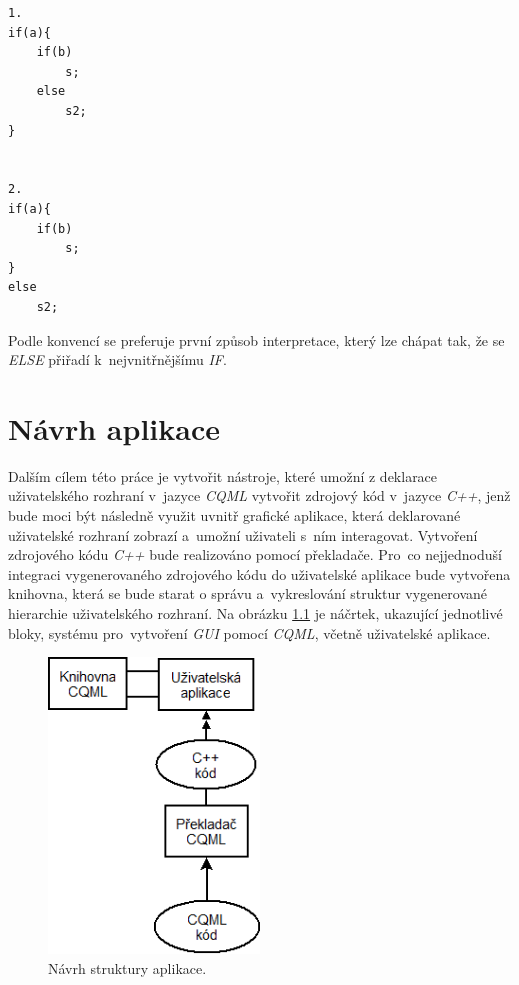 \documentclass[11pt,twoside,a4paper]{book}
\begin{document}
\begin{lstlisting}[float,frame=single,caption=Možnosti interpretace víceznačného výroku \textit{IF}-\textit{ELSE},label=lst:if3]
1.
if(a){
	if(b)
		s;
	else
		s2;
}


2.
if(a){
	if(b)
		s;
}
else
	s2;
\end{lstlisting}
Podle konvencí se preferuje první způsob interpretace, který lze chápat tak, že se \textit{ELSE} přiřadí k~nejvnitřnějšímu \textit{IF}.


\chapter{\label{CH:appDesign}Návrh aplikace}
Dalším cílem této práce je vytvořit nástroje, které umožní z deklarace uživatelského rozhraní v~jazyce \textit{CQML} vytvořit zdrojový kód v~jazyce \textit{C++}, jenž bude moci být následně využit uvnitř grafické aplikace, která deklarované uživatelské rozhraní zobrazí a~umožní uživateli s~ním interagovat. Vytvoření zdrojového kódu \textit{C++} bude realizováno pomocí překladače. Pro~co nejjednoduší integraci vygenerovaného zdrojového kódu do uživatelské aplikace bude vytvořena knihovna, která se bude starat o správu a~vykreslování struktur vygenerované hierarchie uživatelského rozhraní. Na obrázku \ref{fig:structure1} je náčrtek, ukazující jednotlivé bloky, systému pro~vytvoření \textit{GUI} pomocí \textit{CQML}, včetně uživatelské aplikace. \\
\begin{figure}[!ht]
\begin{center}
  \includegraphics[width=0.5\textwidth]{Diagram1}
\caption{{\label{fig:structure1}}Návrh struktury aplikace.}
\end{center}
\end{figure}
\end{document}
